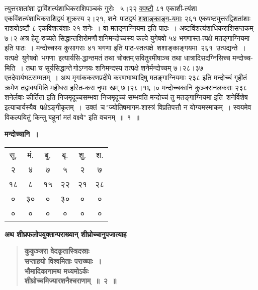 \documentclass[11pt, openany]{book}
\begin{document}
\newpage

\noindent त्युत्तरशतांशा द्वाविंशत्यंशाधिकराशिपञ्चकं गुरोः ~५।२२ \hyperref[2.1]{क्वष्टौ} ८१ एकाशी-त्यंशा एकविंशत्यंशाधिकराशिद्वयं शुक्रस्य २।२१, शनेः पाठद्वयं \hyperref[2.1]{शशाङ्काङ्ग-यमाः} २६१ एकषष्ट्युत्तरद्विशतांशाः राशयोऽष्टौ ८ एकविंशत्यंशाः २१ शनेः~। वा मतङ्गाग्नियमा इति पाठः~। अष्टविंशत्यंशाधिकराशिसप्तकम् ७।२ अत्र हेतु-रुच्यते {\color{violet}सिद्धान्तशिरोमणौ}\textendash \,शनिमन्दोच्चस्य कल्पे युगेषवो ५४ भगणास्त-त्पक्षे मतङ्गाग्नियमा इति पाठः~। मन्दोच्चस्य कुसागराः ४१ भगणा इति पाठ-स्तत्पक्षे \,शशाङ्काङ्गयमा \,२६१ \,उत्पद्यन्ते~। यत्पक्षे \,युगेषवो \,भगणा \,इ{\color{violet}त्यार्यसि-द्धान्त}मतं तथा चोक्तम्\textendash \,सवितुरमीषाञ्च तथा धात्रादिसदग्निसिच्च मन्दोच्च-मिति~। तथा च {\color{violet}सूर्यसिद्धान्ते}\textendash \,गोऽग्नयः शनिमन्दस्य तत्पक्षे शनेर्मन्दोच्चम् ७।२८।३७ एतदेवार्यभटसम्मतम्~। अथ मृगांककरणप्रदीपे करणभाष्यादिषु मतङ्गाग्नियमाः २३८ इति मन्दोच्चं गृहीतं क्रमेण तद्वाक्यमिति महीधरा हस्ति-करा नृपाः खम् ७।२८।१६।० मन्दोच्चकानि कुञ्जरानलकराः २३८ शनेर्लवाः कीर्तिता इति निजमृदूच्चसम्भवा निजमृदूच्चं सम्भवति मन्दोच्चं तु मतङ्गाग्नियमा इति \,शनेर्विशेष \,इत्याचार्यस्यैव \,पक्षेऽङ्गीकृतम्~। \,उक्तं \,च\textendash \,{\color{violet}"ज्योतिषमागम-शास्त्रं विप्रतिपत्तौ न योग्यमस्माकम्~। स्वयमेव विकल्पयितुं किन्तु बहूनां मतं वक्ष्ये"} इति वचनम्~॥~१~॥

\newpage

\begin{center}
{\large \textbf{मन्दोच्चानि~।}} 
\vspace{4mm}

\begin{tabular}{cccccc}
सू. & मं. & बु. & बृ. & शु. & श. \\
२ & ४ & ७ & ५ & २ & ७\\
१८ & ८ & १५ & २२ & २१ & २८\\
० & ३० & ० & ३० & ० & ०\\
० & ० & ० & ० & ० & ० 
\end{tabular}
\end{center}
\vspace{4mm}

{\small \textbf{अथ शीघ्रफलोपयुक्तान्पराख्यान् शीघ्रोच्चानुपजात्याह\textendash }}

 \label{2.2}
\begin{quote}
{\large \textbf{{\color{purple}कुकुञ्जरा वेदकृतास्त्रिदस्राः \\
सप्ताहयो विश्वमिताः पराख्याः~। \\
भौमादिकानामथ मध्यमोऽर्कः \\
शीघ्रोच्चमिज्यारशनैश्चराणाम्~॥~२~॥}}}
\end{quote}
\end{document}
